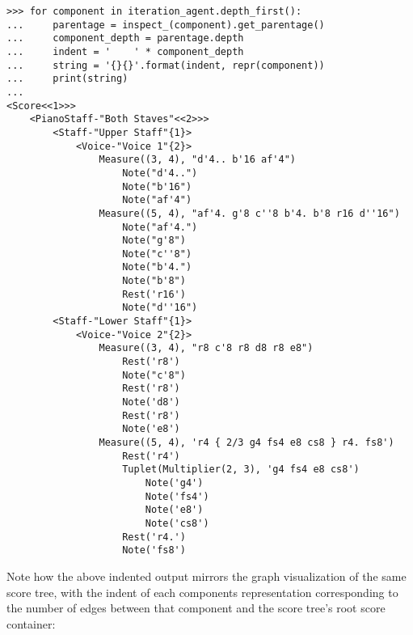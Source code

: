 \begin{comment}
<abjad>
for component in iteration_agent.depth_first():
    parentage = inspect_(component).get_parentage()
    component_depth = parentage.depth
    indent = '    ' * component_depth
    string = '{}{}'.format(indent, repr(component))
    print(string)

</abjad>
\end{comment}

\begin{abjadbookoutput}
\begin{singlespacing}
\vspace{-0.5\baselineskip}
\begin{verbatim}
>>> for component in iteration_agent.depth_first():
...     parentage = inspect_(component).get_parentage()
...     component_depth = parentage.depth
...     indent = '    ' * component_depth
...     string = '{}{}'.format(indent, repr(component))
...     print(string)
...
<Score<<1>>>
    <PianoStaff-"Both Staves"<<2>>>
        <Staff-"Upper Staff"{1}>
            <Voice-"Voice 1"{2}>
                Measure((3, 4), "d'4.. b'16 af'4")
                    Note("d'4..")
                    Note("b'16")
                    Note("af'4")
                Measure((5, 4), "af'4. g'8 c''8 b'4. b'8 r16 d''16")
                    Note("af'4.")
                    Note("g'8")
                    Note("c''8")
                    Note("b'4.")
                    Note("b'8")
                    Rest('r16')
                    Note("d''16")
        <Staff-"Lower Staff"{1}>
            <Voice-"Voice 2"{2}>
                Measure((3, 4), "r8 c'8 r8 d8 r8 e8")
                    Rest('r8')
                    Note("c'8")
                    Rest('r8')
                    Note('d8')
                    Rest('r8')
                    Note('e8')
                Measure((5, 4), 'r4 { 2/3 g4 fs4 e8 cs8 } r4. fs8')
                    Rest('r4')
                    Tuplet(Multiplier(2, 3), 'g4 fs4 e8 cs8')
                        Note('g4')
                        Note('fs4')
                        Note('e8')
                        Note('cs8')
                    Rest('r4.')
                    Note('fs8')
\end{verbatim}
\end{singlespacing}
\end{abjadbookoutput}

\noindent Note how the above indented output mirrors the graph visualization of
the same score tree, with the indent of each components representation
corresponding to the number of edges between that component and the score
tree's root score container:

